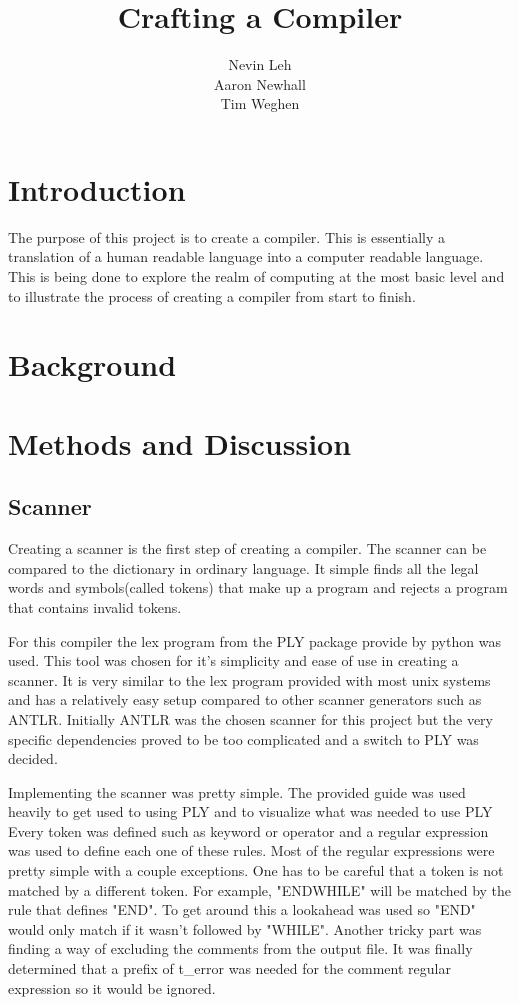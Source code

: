 \documentclass[11pt, oneside]{article}   	%
\title{Crafting a Compiler}
\author{Nevin Leh\\Aaron Newhall\\Tim Weghen}
\begin{document}
\maketitle
\section{Introduction}
The purpose of this project is to create a compiler. This is essentially a translation of a human readable language into a computer readable language. This is being done to explore the realm of computing at the most basic level and to illustrate the process of creating a compiler from start to finish.
\section{Background}
\section{Methods and Discussion}
\subsection{Scanner}
Creating a scanner is the first step of creating a compiler. The scanner can be compared to the dictionary in ordinary language. It simple finds all the legal words and symbols(called tokens) that make up a program and rejects a program that contains invalid tokens.

	For this compiler the lex program from the PLY package provide by python was used. This tool was chosen for it's simplicity and ease of use in creating a scanner. It is very similar to the lex program provided with most unix systems and has a relatively easy setup compared to other scanner generators such as ANTLR. Initially ANTLR was the chosen scanner for this project but the very specific dependencies proved to be too complicated and a switch to PLY was decided.
	
Implementing the scanner was pretty simple. The provided guide was used heavily to get used to using PLY and to visualize what was needed to use PLY Every token was defined such as keyword or operator and a regular expression was used to define each one of these rules. Most of the regular expressions were pretty simple with a couple exceptions. One has to be careful that a token is not matched by a different token. For example, "ENDWHILE" will be matched by the rule that defines "END". To get around this a lookahead was used so "END" would only match if it wasn't followed by "WHILE". Another tricky part was finding a way of excluding the comments from the output file. It was finally determined that a prefix of t\_error was needed for the comment regular expression so it would be ignored.
	
\end{document}
